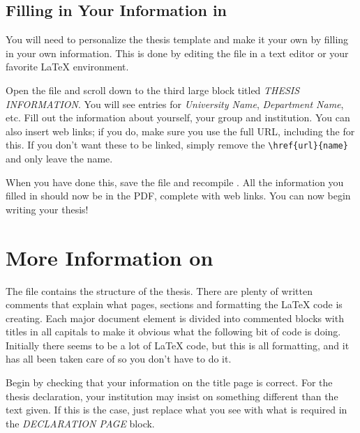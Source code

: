 \subsection{Filling in Your Information in }\label{FillingFile}

You will need to personalize the thesis template and make it your own by filling in your own information. This is done by editing the  file in a text editor or your favorite LaTeX environment.

Open the file and scroll down to the third large block titled \emph{THESIS INFORMATION}. You will see entries for \emph{University Name}, \emph{Department Name}, etc. Fill out the information about yourself, your group and institution.%
You can also insert web links; if you do, make sure you use the full URL, including the  for this. If you don't want these to be linked, simply remove the \verb|\href{url}{name}| and only leave the name.

When you have done this, save the file and recompile . All the information you filled in should now be in the PDF, complete with web links. You can now begin writing your thesis!


\section{More Information on }

The  file contains the structure of the thesis. There are plenty of written comments that explain what pages, sections and formatting the LaTeX code is creating. Each major document element is divided into commented blocks with titles in all capitals to make it obvious what the following bit of code is doing. Initially there seems to be a lot of LaTeX code, but this is all formatting, and it has all been taken care of so you don't have to do it.

Begin by checking that your information on the title page is correct. For the thesis declaration, your institution may insist on something different than the text given. If this is the case, just replace what you see with what is required in the \emph{DECLARATION PAGE} block.

